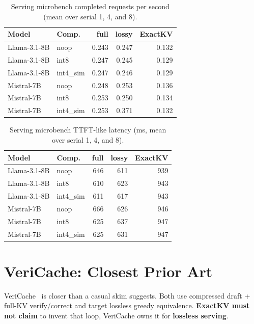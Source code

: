\documentclass[11pt]{article}
\begin{document}
\begin{table}[htbp]
\centering\footnotesize
\caption{Serving microbench completed requests per second (mean over serial 1, 4, and 8).}
\label{tab:serving-rps}
\begin{tabular}{@{}llrrr@{}}
\toprule
Model & Comp. & full & lossy & ExactKV \\ \midrule
Llama-3.1-8B & noop & 0.243 & 0.247 & 0.132 \\
Llama-3.1-8B & int8 & 0.247 & 0.245 & 0.129 \\
Llama-3.1-8B & int4\_sim & 0.247 & 0.246 & 0.129 \\
Mistral-7B & noop & 0.248 & 0.253 & 0.136 \\
Mistral-7B & int8 & 0.253 & 0.250 & 0.134 \\
Mistral-7B & int4\_sim & 0.253 & 0.371 & 0.132 \\
\bottomrule
\end{tabular}
\end{table}

\begin{table}[htbp]
\centering\footnotesize
\caption{Serving microbench TTFT-like latency (ms, mean over serial 1, 4, and 8).}
\label{tab:serving-ttft}
\begin{tabular}{@{}llrrr@{}}
\toprule
Model & Comp. & full & lossy & ExactKV \\ \midrule
Llama-3.1-8B & noop & 646 & 611 & 939 \\
Llama-3.1-8B & int8 & 610 & 623 & 943 \\
Llama-3.1-8B & int4\_sim & 611 & 617 & 943 \\
Mistral-7B & noop & 666 & 626 & 946 \\
Mistral-7B & int8 & 625 & 637 & 947 \\
Mistral-7B & int4\_sim & 625 & 631 & 947 \\
\bottomrule
\end{tabular}
\end{table}

\section{VeriCache: Closest Prior Art}
VeriCache~\citep{vericache2026} is closer than a casual skim suggests. Both use
compressed draft + full-KV verify/correct and target lossless greedy equivalence.
\textbf{ExactKV must not claim} to invent that loop, VeriCache owns it for
\textbf{lossless serving}.
\end{document}
